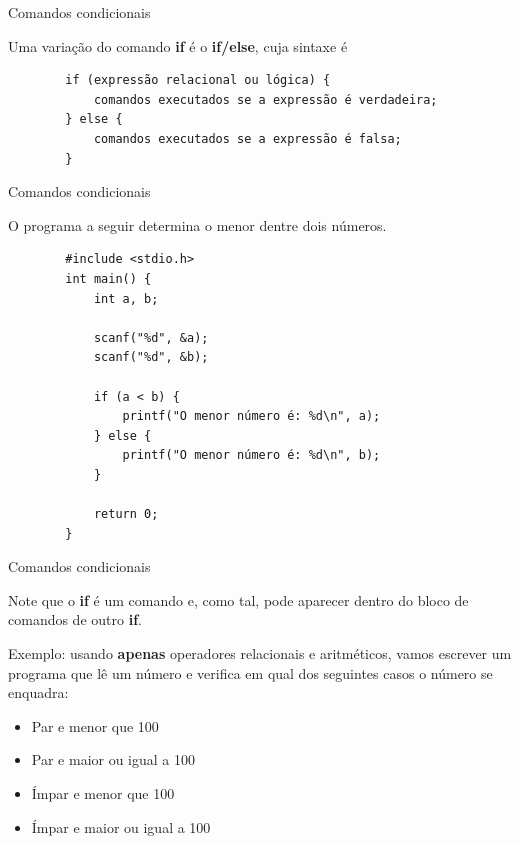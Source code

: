 \documentclass[handout]{beamer}
\begin{document}
\begin{frame}[fragile]{Comandos condicionais}

    Uma variação do comando {\bf if} é o {\bf if/else}, cuja sintaxe é

    \begin{verbatim}
        if (expressão relacional ou lógica) {
            comandos executados se a expressão é verdadeira;
        } else {
            comandos executados se a expressão é falsa;
        }
    \end{verbatim}
\end{frame}

\begin{frame}[fragile]{Comandos condicionais}

    O programa a seguir determina o menor dentre dois números.

    \begin{verbatim}
        #include <stdio.h>
        int main() {
            int a, b;

            scanf("%d", &a);
            scanf("%d", &b);

            if (a < b) {
                printf("O menor número é: %d\n", a);
            } else {
                printf("O menor número é: %d\n", b);
            }

            return 0;
        }
    \end{verbatim}
\end{frame}

\begin{frame}[fragile]{Comandos condicionais}

    Note que o {\bf if} é um comando e, como tal, pode aparecer dentro do bloco de comandos de outro {\bf if}.

    Exemplo: usando \textbf{apenas} operadores relacionais e aritméticos, vamos escrever um programa que lê um número e verifica em qual dos seguintes casos o número se enquadra:
    \begin{itemize}
        \item Par e menor que 100
        \item Par e maior ou igual a 100
        \item Ímpar e menor que 100
        \item Ímpar e maior ou igual a 100
    \end{itemize}
\end{frame}
\end{document}
